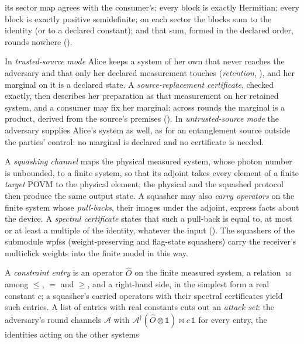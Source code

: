 \begin{description}[leftmargin=0pt,itemsep=3pt]
  its sector map agrees with the consumer's; every block is exactly Hermitian;
  every block is exactly positive semidefinite; on each sector the blocks sum
  to the identity (or to a declared constant); and that sum, formed in the
  declared order, rounds nowhere ().
\item[Source modes; source replacement.] In \emph{trusted-source mode} Alice
  keeps a system of her own that never reaches the adversary and that only her
  declared measurement touches (\emph{retention}, ),
  and her marginal on it is a declared state. A \emph{source-replacement
  certificate}, checked exactly, then describes her preparation as that
  measurement on her retained system, and a consumer may fix her marginal;
  across rounds the marginal is a product, derived from the source's premises
  (). In \emph{untrusted-source mode} the adversary
  supplies Alice's system as well, as for an entanglement source outside the
  parties' control: no marginal is declared and no certificate is needed.
\item[Squashing; spectral certificates.] A \emph{squashing channel} maps the physical measured system, whose photon number is
  unbounded, to a finite system, so that its adjoint takes every element of a
  finite \emph{target} POVM to the physical element; the physical and the
  squashed protocol then produce the same output state. A squasher may also
  \emph{carry operators} on the finite system whose \emph{pull-backs}, their
  images under the adjoint, express facts about the device. A \emph{spectral
  certificate} states that such a pull-back is equal to, at most or at least a
  multiple of the identity, whatever the input
  (). The squashers of the submodule wpfss
  (weight-preserving and flag-state squashers) carry the receiver's multiclick
  weights into the finite model in this way.
\item[Constraint entries; attack-set licence.] A \emph{constraint entry} is an
  operator $\hat O$ on the finite measured system, a relation $\bowtie$ among
  $\le$, $=$ and $\ge$, and a right-hand side, in the simplest form a real
  constant $c$; a squasher's carried operators with their spectral
  certificates yield such entries. A list of entries with real constants cuts
  out an \emph{attack set}: the adversary's round channels
  $\mathcal{A}$ with $\mathcal{A}^{\dagger}(\hat O\otimes\mathds{1})\bowtie
  c\,\mathds{1}$ for every entry, the identities acting on the other systems

\end{description}
